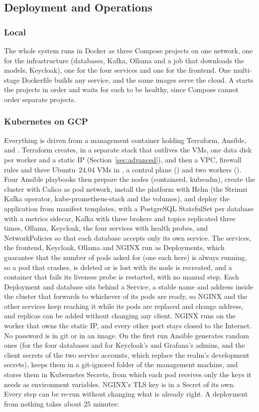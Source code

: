 \subsection{Deployment and Operations}\label{sec:deployment}
\subsubsection{Local} The whole system runs in Docker as three Compose projects on one network, one for the infrastructure (databases, Kafka, Ollama and a job that downloads the models, Keycloak), one for the four services and one for the frontend. One multi-stage Dockerfile builds any service, and the same images serve the cloud. A  starts the projects in order and waits for each to be healthy, since Compose cannot order separate projects.

\subsubsection{Kubernetes on GCP} Everything is driven from a management container holding Terraform, Ansible,  and . Terraform creates, in a separate stack that outlives the VMs, one data disk per worker and a static IP (Section~\ref{sec:advanced}), and then a VPC, firewall rules and three Ubuntu~24.04 VMs in , a control plane () and two workers (). Four Ansible playbooks then prepare the nodes (containerd, kubeadm), create the cluster with Calico as pod network, install the platform with Helm (the Strimzi Kafka operator, kube-prometheus-stack and the volumes), and deploy the application from manifest templates, with a PostgreSQL StatefulSet per database with a metrics sidecar, Kafka with three brokers and topics replicated three times, Ollama, Keycloak, the four services with health probes, and NetworkPolicies so that each database accepts only its own service. The services, the frontend, Keycloak, Ollama and NGINX run as Deployments, which guarantee that the number of pods asked for (one each here) is always running, so a pod that crashes, is deleted or is lost with its node is recreated, and a container that fails its liveness probe is restarted, with no manual step. Each Deployment and database sits behind a Service, a stable name and address inside the cluster that forwards to whichever of its pods are ready, so NGINX and the other services keep reaching it while its pods are replaced and change address, and replicas can be added without changing any client. NGINX runs on the worker that owns the static IP, and every other port stays closed to the Internet. No password is in git or in an image. On the first run Ansible generates random ones (for the four databases and for Keycloak's and Grafana's admins, and the client secrets of the two service accounts, which replace the realm's development secrets), keeps them in a git-ignored folder of the management machine, and stores them in Kubernetes Secrets, from which each pod receives only the keys it needs as environment variables. NGINX's TLS key is in a Secret of its own. Every step can be re-run without changing what is already right. A deployment from nothing takes about 25 minutes:

